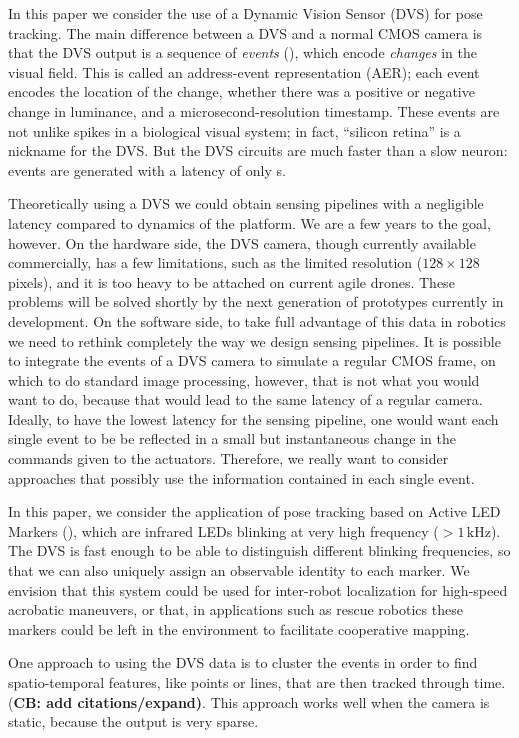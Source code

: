 In this paper we consider the use of a Dynamic Vision Sensor (DVS)
for pose tracking. The main difference between a DVS and a normal
CMOS camera is that the DVS output is a sequence of \emph{events}
(), which encode \emph{changes} in the
visual field. This is called an address-event representation (AER);
each event encodes the location of the change, whether there was a
positive or negative change in luminance, and a microsecond-resolution
timestamp.  These events are not unlike spikes in a biological visual
system; in fact, ``silicon retina'' is a nickname for the DVS. But
the DVS circuits are much faster than a slow neuron: events are generated
with a latency of only \xxx \textmu{}s. 

Theoretically using a DVS we could obtain sensing pipelines with a
negligible latency compared to dynamics of the platform. We are a
few years to the goal, however. On the hardware side, the DVS camera,
though currently available commercially, has a few limitations, such
as the limited resolution ($128\times128$ pixels), and it is too
heavy to be attached on current agile drones. These problems will
be solved shortly by the next generation of prototypes currently in
development. On the software side, to take full advantage of this
data in robotics we need to rethink completely the way we design sensing
pipelines. It is possible to integrate the events of a DVS camera
to simulate a regular CMOS frame, on which to do standard image processing,
however, that is not what you would want to do, because that would
lead to the same latency of a regular camera. Ideally, to have the
lowest latency for the sensing pipeline, one would want each single
event to be be reflected in a small but instantaneous change in the
commands given to the actuators. Therefore, we really want to consider
approaches that possibly use the information contained in each single
event.

In this paper, we consider the application of pose tracking based
on Active LED Markers (\ALMs), which are infrared LEDs blinking at
very high frequency ($>1\,\mbox{kHz}$). The DVS is fast enough to
be able to distinguish different blinking frequencies, so that we
can also uniquely assign an observable identity to each marker. We
envision that this system could be used for inter-robot localization
for high-speed acrobatic maneuvers, or that, in applications such
as rescue robotics these markers could be left in the environment
to facilitate cooperative mapping.

One approach to using the DVS data is to cluster the events in order
to find spatio-temporal features, like points or lines, that are then
tracked through time. (\textbf{CB: add citations/expand)}. This approach
works well when the camera is static, because the output is very sparse. 

